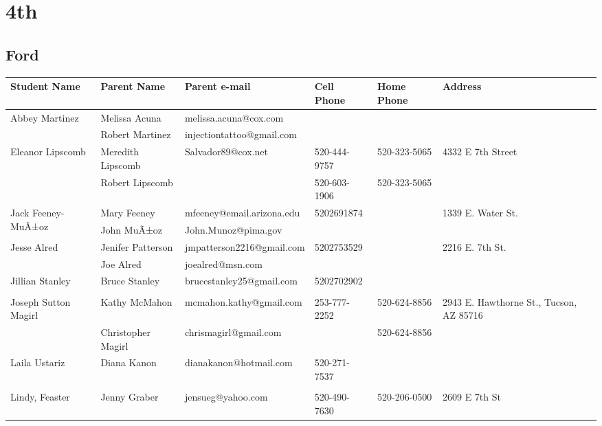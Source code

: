 \documentclass[landscape]{article}\usepackage[]{graphicx}\usepackage[]{color}
\begin{document}
\section{4th}
\subsection{Ford}
\begin{longtable}{|p{100pt}|p{100pt}|p{140pt}|p{60pt}|p{64pt}|p{120pt}|}
\textbf{Student Name} & \textbf{Parent Name} & \textbf{Parent e-mail} & \textbf{Cell Phone} & \textbf{Home Phone} & \textbf{Address}\\
\hline
\hline
\multirow{2}{100pt}{Abbey Martinez} & Melissa Acuna & melissa.acuna@cox.com &  &  & \multirow{2}{120pt}{} \\
 & Robert Martinez & injectiontattoo@gmail.com &  &  & \\
\hline
\multirow{2}{100pt}{Eleanor Lipscomb} & Meredith Lipscomb & Salvador89@cox.net & 520-444-9757 & 520-323-5065 & \multirow{2}{120pt}{4332 E 7th Street} \\
 & Robert Lipscomb &  & 520-603-1906 & 520-323-5065 & \\
\hline
\multirow{2}{100pt}{Jack Feeney-MuÃ±oz} & Mary Feeney & mfeeney@email.arizona.edu & 5202691874 &  & \multirow{2}{120pt}{1339 E. Water St.} \\
 & John MuÃ±oz & John.Munoz@pima.gov &  &  & \\
\hline
\multirow{2}{100pt}{Jesse Alred} & Jenifer Patterson & jmpatterson2216@gmail.com & 5202753529 &  & \multirow{2}{120pt}{2216 E. 7th St.} \\
 & Joe Alred & joealred@msn.com &  &  & \\
\hline
\multirow{2}{100pt}{Jillian Stanley} & Bruce Stanley & brucestanley25@gmail.com & 5202702902 &  & \multirow{2}{120pt}{} \\
 &  &  &  &  & \\
\hline
\multirow{2}{100pt}{Joseph Sutton Magirl} & Kathy McMahon & mcmahon.kathy@gmail.com & 253-777-2252 & 520-624-8856 & \multirow{2}{120pt}{2943 E. Hawthorne St., Tucson, AZ 85716} \\
 & Christopher Magirl & chrismagirl@gmail.com &  & 520-624-8856 & \\
\hline
\multirow{2}{100pt}{Laila Ustariz} & Diana Kanon & dianakanon@hotmail.com & 520-271-7537 &  & \multirow{2}{120pt}{} \\
 &  &  &  &  & \\
\hline
\multirow{2}{100pt}{Lindy, Feaster} & Jenny Graber & jensueg@yahoo.com & 520-490-7630 & 520-206-0500 & \multirow{2}{120pt}{2609 E 7th St} \\

\end{longtable}
\end{document}
